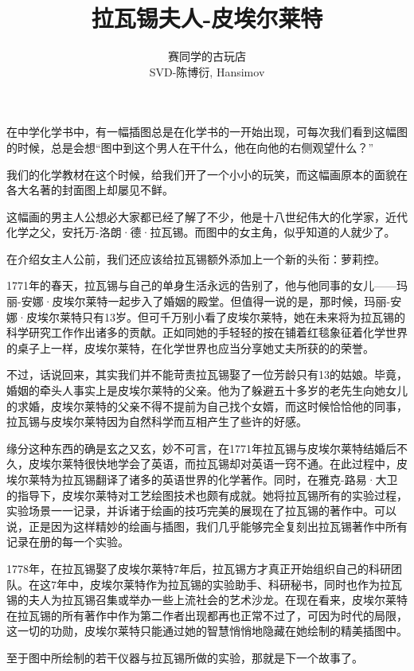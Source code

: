 \documentclass[a4paper]{article}
\title{拉瓦锡夫人-皮埃尔莱特}
\author{赛同学的古玩店 \\ SVD-陈博衍, Hansimov}
\begin{document}
\maketitle

在中学化学书中，有一幅插图总是在化学书的一开始出现，可每次我们看到这幅图的时候，总是会想“图中到这个男人在干什么，他在向他的右侧观望什么？”

我们的化学教材在这个时候，给我们开了一个小小的玩笑，而这幅画原本的面貌在各大名著的封面图上却屡见不鲜。

这幅画的男主人公想必大家都已经了解了不少，他是十八世纪伟大的化学家，近代化学之父，安托万-洛朗·德·拉瓦锡。而图中的女主角，似乎知道的人就少了。

在介绍女主人公前，我们还应该给拉瓦锡额外添加上一个新的头衔：萝莉控。

1771年的春天，拉瓦锡与自己的单身生活永远的告别了，他与他同事的女儿——玛丽-安娜·皮埃尔莱特一起步入了婚姻的殿堂。但值得一说的是，那时候，玛丽-安娜·皮埃尔莱特只有13岁。但可千万别小看了皮埃尔莱特，她在未来将为拉瓦锡的科学研究工作作出诸多的贡献。正如同她的手轻轻的按在铺着红毯象征着化学世界的桌子上一样，皮埃尔莱特，在化学世界也应当分享她丈夫所获的的荣誉。

不过，话说回来，其实我们并不能苛责拉瓦锡娶了一位芳龄只有13的姑娘。毕竟，婚姻的牵头人事实上是皮埃尔莱特的父亲。他为了躲避五十多岁的老先生向她女儿的求婚，皮埃尔莱特的父亲不得不提前为自己找个女婿，而这时候恰恰他的同事，拉瓦锡与皮埃尔莱特因为自然科学而互相产生了些许的好感。

缘分这种东西的确是玄之又玄，妙不可言，在1771年拉瓦锡与皮埃尔莱特结婚后不久，皮埃尔莱特很快地学会了英语，而拉瓦锡却对英语一窍不通。在此过程中，皮埃尔莱特为拉瓦锡翻译了诸多的英语世界的化学著作。同时，在雅克-路易·大卫的指导下，皮埃尔莱特对工艺绘图技术也颇有成就。她将拉瓦锡所有的实验过程，实验场景一一记录，并诉诸于绘画的技巧完美的展现在了拉瓦锡的著作中。可以说，正是因为这样精妙的绘画与插图，我们几乎能够完全复刻出拉瓦锡著作中所有记录在册的每一个实验。


1778年，在拉瓦锡娶了皮埃尔莱特7年后，拉瓦锡方才真正开始组织自己的科研团队。在这7年中，皮埃尔莱特作为拉瓦锡的实验助手、科研秘书，同时也作为拉瓦锡的夫人为拉瓦锡召集或举办一些上流社会的艺术沙龙。在现在看来，皮埃尔莱特在拉瓦锡的所有著作中作为第二作者出现都再也正常不过了，可因为时代的局限，这一切的功勋，皮埃尔莱特只能通过她的智慧悄悄地隐藏在她绘制的精美插图中。

至于图中所绘制的若干仪器与拉瓦锡所做的实验，那就是下一个故事了。
\end{document}
